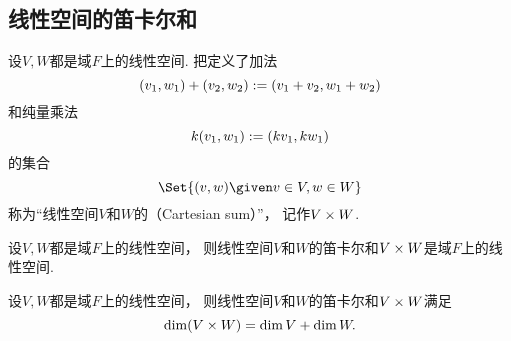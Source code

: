 \subsection{线性空间的笛卡尔和}
\begin{definition}
设\(V,W\)都是域\(F\)上的线性空间.
把定义了加法\begin{equation*}
	(v_1,w_1) + (v_2,w_2) := (v_1+v_2,w_1+w_2)
\end{equation*}
和纯量乘法\begin{equation*}
	k (v_1,w_1) := (k v_1,k w_1)
\end{equation*}
的集合\begin{equation*}
	\Set{
		(v,w)
		\given
		v \in V,
		w \in W
	}
\end{equation*}
称为“线性空间\(V\)和\(W\)的（Cartesian sum）”，
记作\(V \times W\).
\end{definition}

\begin{theorem}
设\(V,W\)都是域\(F\)上的线性空间，
则线性空间\(V\)和\(W\)的笛卡尔和\(V \times W\)是域\(F\)上的线性空间.
\end{theorem}

\begin{theorem}\label{theorem:线性空间.笛卡尔和的维数公式}
设\(V,W\)都是域\(F\)上的线性空间，
则线性空间\(V\)和\(W\)的笛卡尔和\(V \times W\)满足\[
	\dim(V \times W) = \dim V + \dim W.
\]
\end{theorem}

